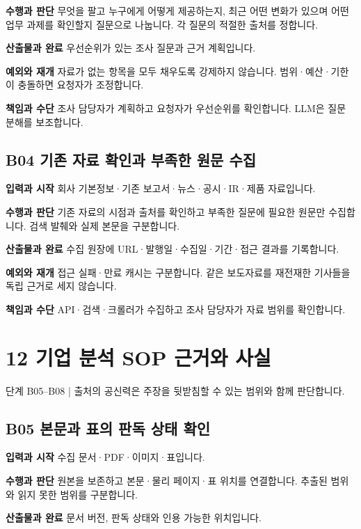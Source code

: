 \documentclass[a4paper,10pt]{article}
\begin{document}
\noindent\textbf{수행과 판단} 무엇을 팔고 누구에게 어떻게 제공하는지, 최근 어떤 변화가 있으며 어떤 업무 과제를 확인할지 질문으로 나눕니다. 각 질문의 적절한 출처를 정합니다.


\noindent\textbf{산출물과 완료} 우선순위가 있는 조사 질문과 근거 계획입니다.


\noindent\textbf{예외와 재개} 자료가 없는 항목을 모두 채우도록 강제하지 않습니다. 범위·예산·기한이 충돌하면 요청자가 조정합니다.


\noindent\textbf{책임과 수단} 조사 담당자가 계획하고 요청자가 우선순위를 확인합니다. LLM은 질문 분해를 보조합니다.


\endgroup
\begingroup\setlength{\parskip}{3pt}
\subsection*{B04 기존 자료 확인과 부족한 원문 수집}
\noindent\textbf{입력과 시작} 회사 기본정보·기존 보고서·뉴스·공시·IR·제품 자료입니다.


\noindent\textbf{수행과 판단} 기존 자료의 시점과 출처를 확인하고 부족한 질문에 필요한 원문만 수집합니다. 검색 발췌와 실제 본문을 구분합니다.


\noindent\textbf{산출물과 완료} 수집 원장에 URL·발행일·수집일·기간·접근 결과를 기록합니다.


\noindent\textbf{예외와 재개} 접근 실패·만료 캐시는 구분합니다. 같은 보도자료를 재전재한 기사들을 독립 근거로 세지 않습니다.


\noindent\textbf{책임과 수단} API·검색·크롤러가 수집하고 조사 담당자가 자료 범위를 확인합니다.


\endgroup
\clearpage
\section*{12 기업 분석 SOP 근거와 사실}
단계 B05–B08  |  출처의 공신력은 주장을 뒷받침할 수 있는 범위와 함께 판단합니다.


\begingroup\setlength{\parskip}{3pt}
\subsection*{B05 본문과 표의 판독 상태 확인}
\noindent\textbf{입력과 시작} 수집 문서·PDF·이미지·표입니다.


\noindent\textbf{수행과 판단} 원본을 보존하고 본문·물리 페이지·표 위치를 연결합니다. 추출된 범위와 읽지 못한 범위를 구분합니다.


\noindent\textbf{산출물과 완료} 문서 버전, 판독 상태와 인용 가능한 위치입니다.
\end{document}
